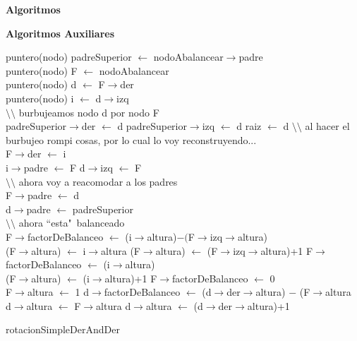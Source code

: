 \documentclass[a4paper,10pt]{article}
\newenvironment{Algoritmos}{%
  \vspace*{2ex}%
  \noindent\textbf{\Large Algoritmos}%
  \vspace*{2ex}%
}{}
\begin{document}
\begin{Algoritmos}
\textbf{Algoritmos Auxiliares}
\newline
{}
\newline
\begin{algorithm}[H]
{puntero(nodo) padreSuperior $\leftarrow$ nodoAbalancear$\rightarrow$padre\\}
{puntero(nodo) F $\leftarrow$ nodoAbalancear\\}
{puntero(nodo) d $\leftarrow$ F$\rightarrow$der\\}
{puntero(nodo) i $\leftarrow$ d$\rightarrow$izq\\}
{$\setminus$$\setminus$ burbujeamos nodo d por nodo F\\}
{
{
{padreSuperior$\rightarrow$der $\leftarrow$ d}
{padreSuperior$\rightarrow$izq $\leftarrow$ d}
}
{raiz $\leftarrow$ d}
}
{$\setminus$$\setminus$ al hacer el burbujeo rompi cosas, por lo cual lo voy reconstruyendo...\\}
{F$\rightarrow$der $\leftarrow$ i\\}
{
{i$\rightarrow$padre $\leftarrow$ F}
{}
}
{d$\rightarrow$izq $\leftarrow$ F\\}
{$\setminus$$\setminus$ ahora voy a reacomodar a los padres\\}
{F$\rightarrow$padre $\leftarrow$ d\\}
{d$\rightarrow$padre $\leftarrow$ padreSuperior\\}
{$\setminus$$\setminus$ ahora ``esta"\ balanceado\\}
{
{
{F$\rightarrow$factorDeBalanceo $\leftarrow$ (i$\rightarrow$altura)$-($F$\rightarrow$izq$\rightarrow$altura) \\
{
{(F$\rightarrow$altura) $\leftarrow$ i$\rightarrow$altura}
{(F$\rightarrow$altura) $\leftarrow$ (F$\rightarrow$izq$\rightarrow$altura)+1}
}
}
{}
}
{
{F$\rightarrow$factorDeBalanceo $\leftarrow$ (i$\rightarrow$altura)\\
(F$\rightarrow$altura) $\leftarrow$ (i$\rightarrow$altura)+1}
{F$\rightarrow$factorDeBalanceo $\leftarrow$ 0\\
 F$\rightarrow$altura $\leftarrow$ 1}
}
{d$\rightarrow$factorDeBalanceo $\leftarrow$ (d$\rightarrow$der$\rightarrow$altura) $-$ (F$\rightarrow$altura\\}
{
{d$\rightarrow$altura $\leftarrow$ F$\rightarrow$altura}
{d$\rightarrow$altura $\leftarrow$ (d$\rightarrow$der$\rightarrow$altura)+1}
}
}
\caption{rotacionSimpleDerAndDer}
\end{algorithm}


\end{Algoritmos}
\end{document}
